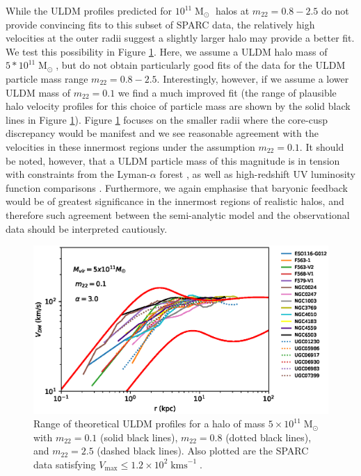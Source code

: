 \documentclass[a4paper,11pt]{article}
\begin{document}
While the ULDM profiles predicted for $10^{11}\operatorname{M}_{\odot}$ halos at $m_{22} = 0.8 - 2.5$ do not provide convincing fits to this subset of SPARC data, the relatively high velocities at the outer radii suggest a slightly larger halo may provide a better fit. We test this possibility in Figure \ref{fig:velocity_23}. Here, we assume a ULDM halo mass of $5*10^{11}\operatorname{M}_{\odot}$, but do not obtain particularly good fits of the data for the ULDM particle mass range $m_{22} = 0.8 - 2.5$. Interestingly, however, if we assume a lower ULDM mass of $m_{22} = 0.1$ we find a much improved fit (the range of plausible halo velocity profiles for this choice of particle mass are shown by the solid black lines in Figure \ref{fig:velocity_23}). Figure \ref{fig:velocity_23} focuses on the smaller radii where the core-cusp discrepancy would be manifest and we see reasonable agreement with the velocities in these innermost regions under the assumption $m_{22} = 0.1$. It should be noted, however, that a ULDM particle mass of this magnitude is in tension with constraints from the Lyman-$\alpha$ forest \cite{Amendola:2005ad}, as well as high-redshift UV luminosity function comparisons \cite{Bozek:2014uqa}. Furthermore, we again emphasise that baryonic feedback would be of greatest significance in the innermost regions of realistic halos, and therefore such agreement between the semi-analytic model and the observational data should be interpreted cautiously. 



\begin{figure}
\centering
\includegraphics[scale = 0.8, trim={0cm 2.5cm 1cm 0.35cm}]{pics/best_match.eps} 
\caption{Range of theoretical ULDM profiles for a halo of mass $5\times 10^{11}\operatorname{M}_{\odot}$ with $m_{22} = 0.1$ (solid black lines), $m_{22} = 0.8$ (dotted black lines), and $m_{22} = 2.5$ (dashed black lines). Also plotted are the SPARC data satisfying $V_{\mathrm{max}}\leq 1.2\times 10^2 \operatorname{kms}^{-1}$. }\label{fig:velocity_23}
\end{figure}
\end{document}

